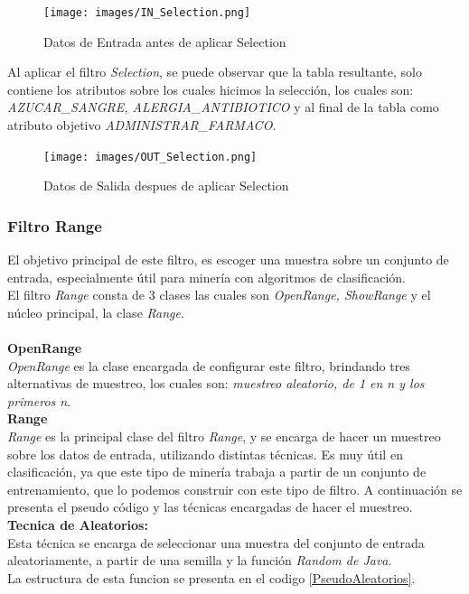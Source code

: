 \begin{figure}[h]
\centering
\texttt{[image: images/IN\_Selection.png]}
\caption{Datos de Entrada antes de aplicar Selection}
\label{IN_Selection}
\end{figure}

Al aplicar el filtro \textit{Selection}, se puede observar que la tabla resultante, solo contiene los atributos sobre los cuales hicimos la selecci\'on, los cuales son: \textit{AZUCAR\_SANGRE, ALERGIA\_ANTIBIOTICO } y al final de la tabla como atributo objetivo  \textit{ADMINISTRAR\_FARMACO.}
 
\begin{figure}[h]
\centering
\texttt{[image: images/OUT\_Selection.png]}
\caption{Datos de Salida despues de aplicar Selection}
\label{IN_Selection}
\end{figure}

\subsubsection{Filtro Range}
El objetivo principal de este filtro, es  escoger una muestra sobre un conjunto de entrada, especialmente \'util para miner\'ia con algoritmos de clasificaci\'on. \\
El filtro  \textit{Range} consta de 3 clases las cuales son \textit{OpenRange, ShowRange} y el n\'ucleo principal, la clase \textit{Range}. \\ \\

\textbf{OpenRange} \\
\textit{OpenRange} es la clase encargada de configurar este filtro, brindando tres alternativas de muestreo, los cuales son: \textit{muestreo aleatorio, de 1 en n y los primeros n}. \\

\textbf{Range} \\
\textit{Range} es la principal clase del filtro \textit{Range}, y se encarga de hacer un muestreo sobre los datos de entrada, utilizando distintas t\'ecnicas. Es muy \'util en clasificaci\'on, ya que este tipo de miner\'ia trabaja a partir de un conjunto de entrenamiento, que lo podemos construir con este tipo de filtro.
A continuaci\'on se presenta el pseudo c\'odigo y las t\'ecnicas encargadas de hacer  el muestreo. \\ 
 
\textbf{Tecnica de Aleatorios:} \\ 
Esta t\'ecnica se encarga de seleccionar una muestra del conjunto de entrada aleatoriamente, a partir de una semilla y la funci\'on \textit{Random de Java}. \\
La estructura de esta funcion se presenta en el codigo \ref{PseudoAleatorios}.\\ 

